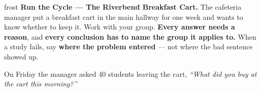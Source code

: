 \documentclass[10pt]{article}
\begin{document}

\vspace{0.15in}

\begin{headlinebox}{frost}
\small
\textbf{Run the Cycle --- The Riverbend Breakfast Cart.} The cafeteria manager put a breakfast
cart in the main hallway for one week and wants to know whether to keep it. Work with your
group. \textbf{Every answer needs a reason}, and \textbf{every conclusion has to name the group
it applies to.} When a study fails, say \textbf{where the problem entered} --- not where the bad
sentence showed up.
\end{headlinebox}

\vspace{0.06in}

\begin{center}
\small
On Friday the manager asked $40$ students leaving the cart,
\textit{``What did you buy at the cart this morning?''}
\end{center}

\vspace{0.04in}
\end{document}
